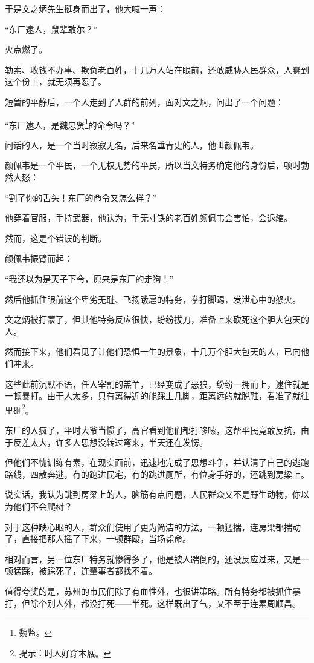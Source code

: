 \begin{multicols}{\theparacolNo}
于是文之炳先生挺身而出了，他大喊一声：

“东厂逮人，鼠辈敢尔？”

火点燃了。

勒索、收钱不办事、欺负老百姓，十几万人站在眼前，还敢威胁人民群众，人蠢到这个份上，就无须再忍了。

短暂的平静后，一个人走到了人群的前列，面对文之炳，问出了一个问题：

“东厂逮人，是魏忠贤\footnote{魏监。}的命令吗？”

问话的人，是一个当时寂寂无名，后来名垂青史的人，他叫颜佩韦。

颜佩韦是一个平民，一个无权无势的平民，所以当文特务确定他的身份后，顿时勃然大怒：

“割了你的舌头！东厂的命令又怎么样？”

他穿着官服，手持武器，他认为，手无寸铁的老百姓颜佩韦会害怕，会退缩。

然而，这是个错误的判断。

颜佩韦振臂而起：

“我还以为是天子下令，原来是东厂的走狗！”

然后他抓住眼前这个卑劣无耻、飞扬跋扈的特务，拳打脚踢，发泄心中的怒火。

文之炳被打蒙了，但其他特务反应很快，纷纷拔刀，准备上来砍死这个胆大包天的人。

然而接下来，他们看见了让他们恐惧一生的景象，十几万个胆大包天的人，已向他们冲来。

这些此前沉默不语，任人宰割的羔羊，已经变成了恶狼，纷纷一拥而上，逮住就是一顿暴打。由于人太多，只有离得近的能踩上几脚，距离远的就脱鞋，看准了就往里砸\footnote{提示：时人好穿木屐。}。

东厂的人疯了，平时大爷当惯了，高官看到他们都打哆嗦，这帮平民竟敢反抗，由于反差太大，许多人思想没转过弯来，半天还在发愣。

但他们不愧训练有素，在现实面前，迅速地完成了思想斗争，并认清了自己的逃跑路线，四散奔逃，有的跑进民宅，有的跳进厕所，有位身手好的，还跳到房梁上。

说实话，我认为跳到房梁上的人，脑筋有点问题，人民群众又不是野生动物，你以为他们不会爬树？

对于这种缺心眼的人，群众们使用了更为简洁的方法，一顿猛揣，连房梁都揣动了，直接把那人摇了下来，一顿群殴，当场毙命。

相对而言，另一位东厂特务就惨得多了，他是被人踹倒的，还没反应过来，又是一顿猛踩，被踩死了，连肇事者都找不着。

值得夸奖的是，苏州的市民们除了有血性外，也很讲策略。所有特务都被抓住暴打，但除个别人外，都没打死——半死。这样既出了气，又不至于连累周顺昌。


\end{multicols}
